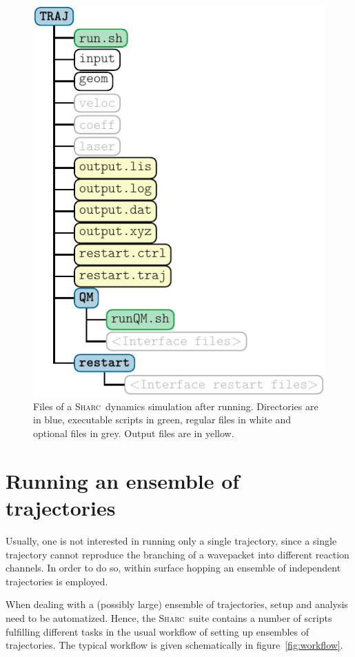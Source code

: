 \documentclass[a4paper,11pt,DIV=15,openany,twoside=false]{scrbook}
\newcommand{\sharc}{\textsc{Sharc}}
\begin{document}
\begin{figure}[h!]
  \centering
  \includegraphics[scale=1]{img/dir_traj/dir_traj_after.pdf}
  \caption{Files of a \sharc\ dynamics simulation after running. Directories are in blue, executable scripts in green, regular files in white and optional files in grey. Output files are in yellow.}
  \label{fig:dir_traj_after}
\end{figure}

\section{Running an ensemble of trajectories}

Usually, one is not interested in running only a single trajectory, since a single trajectory cannot reproduce the branching of a wavepacket into different reaction channels. In order to do so, within surface hopping an ensemble of independent trajectories is employed. 

When dealing with a (possibly large) ensemble of trajectories, setup and analysis need to be automatized. Hence, the \sharc\ suite contains a number of scripts fulfilling different tasks in the usual workflow of setting up ensembles of trajectories.
The typical workflow is given schematically in figure~\ref{fig:workflow}.
\end{document}
